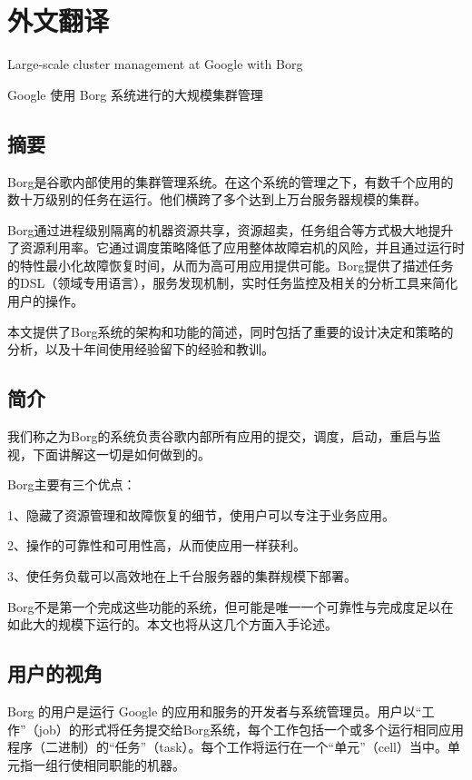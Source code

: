 \cleardoublepage
\chapter{外文翻译}

Large-scale cluster management at Google with Borg

Google 使用 Borg 系统进行的大规模集群管理

\section*{摘要}

Borg是谷歌内部使用的集群管理系统。在这个系统的管理之下，有数千个应用的数十万级别的任务在运行。他们横跨了多个达到上万台服务器规模的集群。

Borg通过进程级别隔离的机器资源共享，资源超卖，任务组合等方式极大地提升了资源利用率。它通过调度策略降低了应用整体故障宕机的风险，并且通过运行时的特性最小化故障恢复时间，从而为高可用应用提供可能。Borg提供了描述任务的DSL（领域专用语言），服务发现机制，实时任务监控及相关的分析工具来简化用户的操作。

本文提供了Borg系统的架构和功能的简述，同时包括了重要的设计决定和策略的分析，以及十年间使用经验留下的经验和教训。

\section{简介}

我们称之为Borg的系统负责谷歌内部所有应用的提交，调度，启动，重启与监视，下面讲解这一切是如何做到的。

Borg主要有三个优点：

1、隐藏了资源管理和故障恢复的细节，使用户可以专注于业务应用。

2、操作的可靠性和可用性高，从而使应用一样获利。

3、使任务负载可以高效地在上千台服务器的集群规模下部署。

Borg不是第一个完成这些功能的系统，但可能是唯一一个可靠性与完成度足以在如此大的规模下运行的。本文也将从这几个方面入手论述。

\section{用户的视角}

Borg 的用户是运行 Google 的应用和服务的开发者与系统管理员。用户以“工作”（job）的形式将任务提交给Borg系统，每个工作包括一个或多个运行相同应用程序（二进制）的“任务”（task）。每个工作将运行在一个“单元”（cell）当中。单元指一组行使相同职能的机器。

